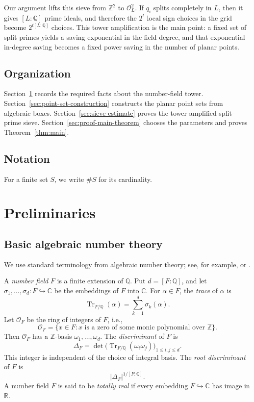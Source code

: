 Our argument lifts this sieve from \(\mathbb Z^2\) to \(\mathcal O_L^2\).
If \(q_i\) splits completely in \(L\), then it gives \([L:\mathbb Q]\) prime ideals, and therefore the \(2^t\) local sign choices in the grid become \(2^{t[L:\mathbb Q]}\) choices.
This tower amplification is the main point: a fixed set of split primes yields a saving exponential in the field degree, and that exponential-in-degree saving becomes a fixed power saving in the number of planar points.

\subsection*{Organization}
Section~\ref{sec:preliminaries} records the required facts about the number-field tower.
Section~\ref{sec:point-set-construction} constructs the planar point sets from algebraic boxes.
Section~\ref{sec:sieve-estimate} proves the tower-amplified split-prime sieve.
Section~\ref{sec:proof-main-theorem} chooses the parameters and proves Theorem~\ref{thm:main}.

\subsection*{Notation}
For a finite set \(S\), we write \(\#S\) for its cardinality.

\section{Preliminaries}
\label{sec:preliminaries}

\subsection{Basic algebraic number theory}
\label{subsec:basic-algebraic-number-theory}

We use standard terminology from algebraic number theory; see, for example, \cite[Chapter~I]{Neu99} or \cite{Mil20}.

A \emph{number field} \(F\) is a finite extension of \(\mathbb Q\).
Put \(d=[F:\mathbb Q]\), and let \(\sigma_1,\ldots,\sigma_d:F\hookrightarrow\mathbb C\) be the embeddings of \(F\) into \(\mathbb C\).
For \(\alpha\in F\), the \emph{trace} of \(\alpha\) is
\[
\operatorname{Tr}_{F/\mathbb Q}(\alpha)
=
\sum_{k=1}^d\sigma_k(\alpha).
\]
Let \(\mathcal O_F\) be the ring of integers of \(F\), i.e.,
\[
\mathcal O_F
=
\{x\in F:x\text{ is a zero of some monic polynomial over }\mathbb Z\}.
\]
Then \(\mathcal O_F\) has a \(\mathbb Z\)-basis \(\omega_1,\ldots,\omega_d\).
The \emph{discriminant} of \(F\) is
\[
\Delta_F
=
\det\bigl(\operatorname{Tr}_{F/\mathbb Q}(\omega_i\omega_j)\bigr)_{1\le i,j\le d}.
\]
This integer is independent of the choice of integral basis.
The \emph{root discriminant} of \(F\) is
\[
|\Delta_F|^{1/[F:\mathbb Q]}.
\]
A number field \(F\) is said to be \emph{totally real} if every embedding \(F\hookrightarrow\mathbb C\) has image in \(\mathbb R\).

